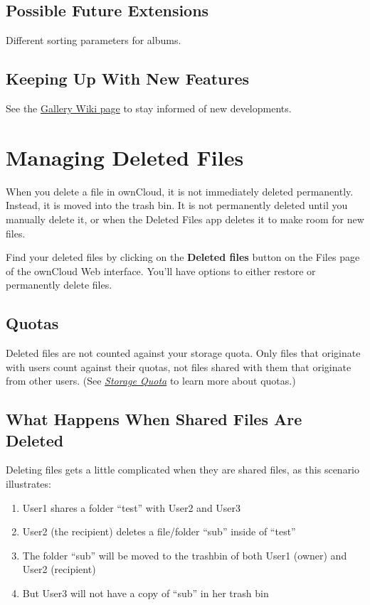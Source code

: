 \documentclass[letterpaper,10pt,english]{sphinxmanual}
\begin{document}
\subsection{Possible Future Extensions}
\label{files/gallery_app:possible-future-extensions}
Different sorting parameters for albums.


\subsection{Keeping Up With New Features}
\label{files/gallery_app:keeping-up-with-new-features}
See the \href{https://github.com/owncloud/gallery/wiki}{Gallery Wiki page} to stay informed of new developments.


\section{Managing Deleted Files}
\label{files/deleted_file_management:managing-deleted-files}\label{files/deleted_file_management::doc}
When you delete a file in ownCloud, it is not immediately deleted permanently.
Instead, it is moved into the trash bin. It is not permanently deleted until
you manually delete it, or when the Deleted Files app deletes it to make room
for new files.

Find your deleted files by clicking on the \textbf{Deleted files}
button on the Files page of the ownCloud Web interface. You'll have options to
either restore or permanently delete files.


\subsection{Quotas}
\label{files/deleted_file_management:quotas}
Deleted files are not counted against your storage quota. Only files that
originate with users count against their quotas, not files
shared with them that originate from other users. (See {\hyperref[files/quota::doc]{\emph{Storage Quota}}} to learn
more about quotas.)


\subsection{What Happens When Shared Files Are Deleted}
\label{files/deleted_file_management:what-happens-when-shared-files-are-deleted}
Deleting files gets a little complicated when they are shared files, as this
scenario illustrates:
\begin{enumerate}
\item {} 
User1 shares a folder ``test'' with User2 and User3

\item {} 
User2 (the recipient) deletes a file/folder ``sub'' inside of ``test''

\item {} 
The folder ``sub'' will be moved to the trashbin of both User1 (owner) and
User2 (recipient)

\item {} 
But User3 will not have a copy of ``sub'' in her trash bin

\end{enumerate}
\end{document}
